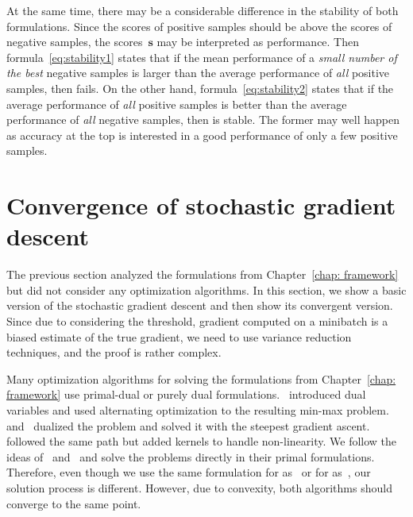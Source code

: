 At the same time, there may be a considerable difference in the stability of both formulations. Since the scores of positive samples should be above the scores of negative samples, the scores~$\bm{s}$ may be interpreted as performance. Then formula~\eqref{eq:stability1} states that if the mean performance of a \emph{small number of the best} negative samples is larger than the average performance of \emph{all} positive samples, then \tauFPL fails. On the other hand, formula~\eqref{eq:stability2} states that if the average performance of \emph{all} positive samples is better than the average performance of \emph{all} negative samples, then \PatMatNP is stable. The former may well happen as accuracy at the top is interested in a good performance of only a few positive samples.

\section{Convergence of stochastic gradient descent}\label{sec:convergence}

The previous section analyzed the formulations from Chapter~\ref{chap: framework} but did not consider any optimization algorithms. In this section, we show a basic version of the stochastic gradient descent and then show its convergent version. Since due to considering the threshold, gradient computed on a minibatch is a biased estimate of the true gradient, we need to use variance reduction techniques, and the proof is rather complex.

Many optimization algorithms for solving the formulations from Chapter~\ref{chap: framework} use primal-dual or purely dual formulations.~\cite{eban2017scalable} introduced dual variables and used alternating optimization to the resulting min-max problem. ~\cite{li2014top} and~\cite{zhang2018tau} dualized the problem and solved it with the steepest gradient ascent.~\cite{macha2020nonlinear} followed the same path but added kernels to handle non-linearity. We follow the ideas of~\cite{mackey2018constrained} and~\cite{adam2019machine} and solve the problems directly in their primal formulations. Therefore, even though we use the same formulation for \TopPush as~\cite{li2014top} or for \tauFPL as~\cite{zhang2018tau}, our solution process is different. However, due to convexity, both algorithms should converge to the same point.

